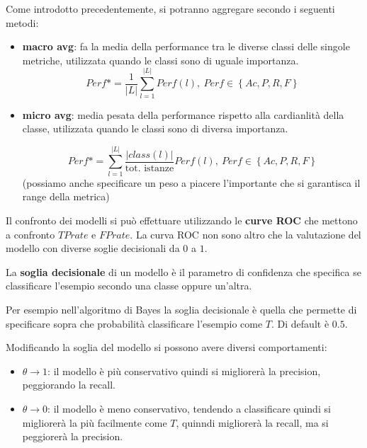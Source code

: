 Come introdotto precedentemente, si potranno aggregare secondo i seguenti metodi:
\begin{itemize}
    \item \textbf{macro avg}: fa la media della performance tra le diverse classi delle singole metriche,
    utilizzata quando le classi sono di uguale importanza.
    \begin{equation}
        Perf\ast = \frac{1}{|L|}\sum\limits_{l=1}^{|L|} Perf(l), \ Perf \in 
        \left\{Ac, P, R, F\right\}
    \end{equation}
    \item \textbf{micro avg}: media pesata della performance rispetto alla cardianlità 
    della classe, utilizzata quando le classi sono di diversa importanza. 
    
    \begin{equation}
        Perf\ast = \sum\limits_{l=1}^{|L|} \frac{|class(l)|}{\text{tot. istanze}}Perf(l), \ Perf \in 
        \left\{Ac, P, R, F\right\}
    \end{equation}
    (possiamo anche specificare un peso a piacere l'importante che si garantisca 
    il range della metrica)
\end{itemize}

Il confronto dei modelli si può effettuare utilizzando le \textbf{curve ROC} che 
mettono a confronto $TP rate$ e $FP rate$. La curva ROC non sono altro che la 
valutazione del modello con diverse soglie decisionali da $0$ a $1$.
\begin{definizione}
    La \textbf{soglia decisionale} di un modello è il parametro di confidenza che specifica
    se classificare l'esempio secondo una classe oppure un'altra.
\end{definizione}

\begin{esempio}
    Per esempio nell'algoritmo di Bayes la soglia decisionale è quella che permette
    di specificare sopra che probabilità classificare l'esempio come $T$. Di default
    è $0.5$.
\end{esempio}

Modificando la soglia del modello si possono avere diversi comportamenti:
\begin{itemize}
    \item $\theta \to 1$: il modello è più conservativo quindi si migliorerà la 
    precision, peggiorando la recall.
    \item $\theta \to 0$: il modello è meno conservativo, tendendo a classificare quindi si migliorerà la 
    più facilmente come $T$, quinndi migliorerà la recall, ma si peggiorerà la 
    precision.
\end{itemize}


